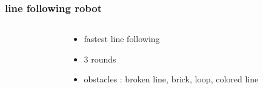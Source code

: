 \documentclass{beamer}
\begin{document}
\begin{frame}
  
  \frametitle{\bf line following robot}
  
  \begin{columns}

    \begin{column}{0.5\textwidth}
    \end{column}

    \begin{column}{0.5\textwidth}
      \begin{itemize}
        \item fastest line following
        \item 3 rounds
        \item obstacles : broken line, brick, loop, colored line
      \end{itemize}
    \end{column}

  \end{columns}
  
\end{frame}
\end{document}
